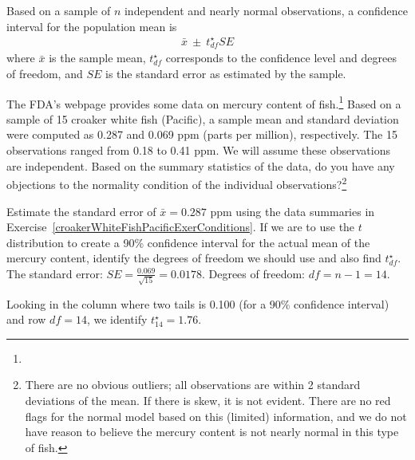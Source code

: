 
\begin{termBox}{
Based on a sample of $n$ independent and nearly normal observations, a confidence interval for the population mean is
\begin{eqnarray*}
\bar{x} \ \pm\  t^{\star}_{df}SE
\end{eqnarray*}
where $\bar{x}$ is the sample mean, $t^{\star}_{df}$ corresponds to the confidence level and degrees of freedom, and $SE$ is the standard error as estimated by the sample.}
\end{termBox}

\begin{exercise} \label{croakerWhiteFishPacificExerConditions}
The FDA's webpage provides some data on mercury content of fish.\footnote{} Based on a sample of 15 croaker white fish (Pacific), a sample mean and standard deviation were computed as 0.287 and 0.069 ppm (parts per million), respectively. The 15 observations ranged from 0.18 to 0.41 ppm. We will assume these observations are independent. Based on the summary statistics of the data, do you have any objections to the normality condition of the individual observations?\footnote{There are no obvious outliers; all observations are within 2 standard deviations of the mean. If there is skew, it is not evident. There are no red flags for the normal model based on this (limited) information, and we do not have reason to believe the mercury content is not nearly normal in this type of fish.}
\end{exercise}

\begin{example}{Estimate the standard error of $\bar{x}=0.287$ ppm using the data summaries in Exercise~\ref{croakerWhiteFishPacificExerConditions}. If we are to use the $t$ distribution to create a 90\% confidence interval for the actual mean of the mercury content, identify the degrees of freedom we should use and also find $t^{\star}_{df}$.}
\label{croakerWhiteFishPacificExerSEDFTStar}
The standard error: $SE = \frac{0.069}{\sqrt{15}} = 0.0178$. Degrees of freedom: $df = n - 1 = 14$.

Looking in the column where two tails is 0.100 (for a 90\% confidence interval) and row $df=14$, we identify $t^{\star}_{14} = 1.76$.
\end{example}

